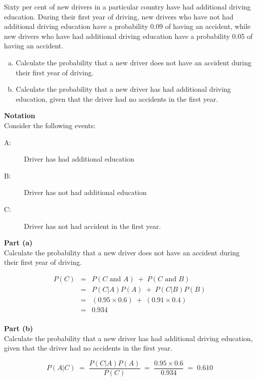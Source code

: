 \documentclass[a4paper,12pt]{article}
\begin{document}
\large
\noindent Sixty per cent of new drivers in a particular country have had additional driving education. During their first year of driving, new drivers who have not had additional
driving education have a probability 0.09 of having an accident, while new drivers who have had additional driving education have a probability 0.05 of having an
accident.
\begin{enumerate}[(a)]
\item Calculate the probability that a new driver does not have an accident during
their first year of driving.
\item Calculate the probability that a new driver has had additional driving
education, given that the driver had no accidents in the first year.
\end{enumerate}

\newpage
\noindent \textbf{Notation}\\
\noindent Consider the following events:
\begin{description}
\item[A:] Driver has had additional education
\item[B:] Driver has not had additional education
\item[C:] Driver has not had accident in the first year.
\end{description}

\medskip 

\noindent \textbf{Part (a)}\\
\noindent Calculate the probability that a new driver does not have an accident during
their first year of driving.

\begin{eqnarray*}
P(C)  &=& P(C \mbox{ and } A)  \;+\; P(C \mbox{ and } B)\\ 
&=& P(C|A)P(A)  \;+\; P(C|B)P(B)\\ 
&=& (0.95 \times 0.6 ) \;+\; (0.91 \times 0.4 ) \\
&=& 0.934 \\
\end{eqnarray*}


\noindent \textbf{Part (b)}\\
\noindent Calculate the probability that a new driver has had additional driving
education, given that the driver had no accidents in the first year.


\[ P(A|C)  \;=\; \frac{ P(C|A)P(A) }{P(C)} \;=\; \frac{0.95 \times 0.6}{0.934} \;=\;0.610\]


\end{document}
